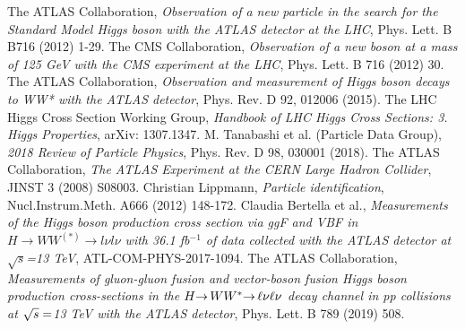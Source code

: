 \begin{thebibliography}{99}

The ATLAS Collaboration, {\it Observation of a new particle in the search for the Standard Model Higgs boson with the ATLAS detector at the LHC},  Phys. Lett. B B716 (2012) 1-29.
The CMS Collaboration, {\it Observation of a new boson at a mass of 125 GeV with the CMS experiment at the LHC}, Phys. Lett. B 716 (2012) 30.
The ATLAS Collaboration, {\it Observation and measurement of Higgs boson decays to WW* with the ATLAS detector}, Phys. Rev. D 92, 012006 (2015).
The LHC Higgs Cross Section Working Group, {\it Handbook of LHC Higgs Cross Sections: 3. Higgs Properties}, arXiv: 1307.1347.
M. Tanabashi et al. (Particle Data Group), {\it 2018 Review of Particle Physics}, Phys. Rev. D 98, 030001 (2018).
The ATLAS Collaboration, {\it The ATLAS Experiment at the CERN Large Hadron Collider}, JINST 3 (2008) S08003.
Christian Lippmann, {\it Particle identification}, Nucl.Instrum.Meth. A666 (2012) 148-172.
Claudia Bertella et al., {\it Measurements of the Higgs boson production cross section via ggF and VBF in $H\rightarrow WW^{(*)} \rightarrow l\nu l\nu$ with 36.1 fb$^{−1}$ of data collected with the ATLAS detector at $\sqrt{s}$=13 TeV}, ATL-COM-PHYS-2017-1094.
The ATLAS Collaboration, {\it Measurements of gluon-gluon fusion and vector-boson fusion Higgs boson production cross-sections in the $H{\rightarrow\,}WW^{\ast}{\rightarrow\,}\ell\nu\ell\nu$ decay channel in pp collisions at $\sqrt{s} = $13 TeV with the ATLAS detector}, Phys. Lett. B 789 (2019) 508.

\end{thebibliography}
\newpage
